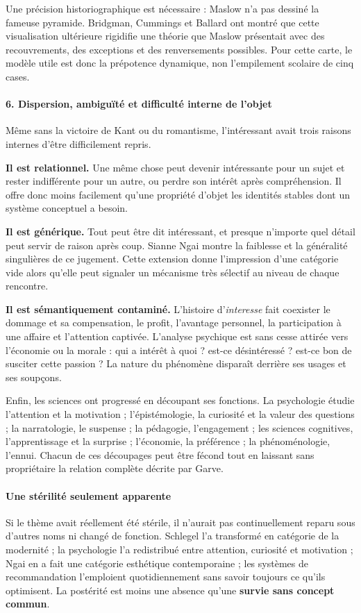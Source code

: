 \documentclass[10pt,a4paper]{article}
\begin{document}
Une précision historiographique est nécessaire : Maslow n'a pas dessiné la fameuse pyramide. Bridgman, Cummings et Ballard ont montré que cette visualisation ultérieure rigidifie une théorie que Maslow présentait avec des recouvrements, des exceptions et des renversements possibles. Pour cette carte, le modèle utile est donc la prépotence dynamique, non l'empilement scolaire de cinq cases.

\paragraph{6. Dispersion, ambiguïté et difficulté interne de l'objet}
Même sans la victoire de Kant ou du romantisme, l'intéressant avait trois raisons internes d'être difficilement repris.

\textbf{Il est relationnel.} Une même chose peut devenir intéressante pour un sujet et rester indifférente pour un autre, ou perdre son intérêt après compréhension. Il offre donc moins facilement qu'une propriété d'objet les identités stables dont un système conceptuel a besoin.

\textbf{Il est générique.} Tout peut être dit intéressant, et presque n'importe quel détail peut servir de raison après coup. Sianne Ngai montre la faiblesse et la généralité singulières de ce jugement. Cette extension donne l'impression d'une catégorie vide alors qu'elle peut signaler un mécanisme très sélectif au niveau de chaque rencontre.

\textbf{Il est sémantiquement contaminé.} L'histoire d'\emph{interesse} fait coexister le dommage et sa compensation, le profit, l'avantage personnel, la participation à une affaire et l'attention captivée. L'analyse psychique est sans cesse attirée vers l'économie ou la morale : qui a intérêt à quoi ? est-ce désintéressé ? est-ce bon de susciter cette passion ? La nature du phénomène disparaît derrière ses usages et ses soupçons.

Enfin, les sciences ont progressé en découpant ses fonctions. La psychologie étudie l'attention et la motivation ; l'épistémologie, la curiosité et la valeur des questions ; la narratologie, le suspense ; la pédagogie, l'engagement ; les sciences cognitives, l'apprentissage et la surprise ; l'économie, la préférence ; la phénoménologie, l'ennui. Chacun de ces découpages peut être fécond tout en laissant sans propriétaire la relation complète décrite par Garve.

\paragraph{Une stérilité seulement apparente}
Si le thème avait réellement été stérile, il n'aurait pas continuellement reparu sous d'autres noms ni changé de fonction. Schlegel l'a transformé en catégorie de la modernité ; la psychologie l'a redistribué entre attention, curiosité et motivation ; Ngai en a fait une catégorie esthétique contemporaine ; les systèmes de recommandation l'emploient quotidiennement sans savoir toujours ce qu'ils optimisent. La postérité est moins une absence qu'une \textbf{survie sans concept commun}.
\end{document}
